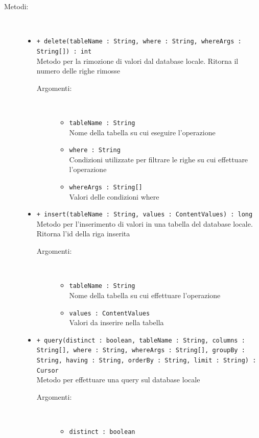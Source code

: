 \documentclass[../DefinizioneDiProdotto.tex]{subfiles}
\begin{document}
\begin{description}
\begin{itemize}
\end{itemize}
\item[Metodi:] \
\begin{itemize}
\item \texttt{+ delete(tableName : String, where : String, whereArgs : String[]) : int}\\
Metodo per la rimozione di valori dal database locale. Ritorna il numero delle righe rimosse
 \begin{description}
\item[Argomenti:] \
\begin{itemize}
\item \texttt{tableName : String}\\
Nome della tabella su cui eseguire l'operazione\item \texttt{where : String}\\
Condizioni utilizzate per filtrare le righe su cui effettuare l'operazione\item \texttt{whereArgs : String[]}\\
Valori delle condizioni where\end{itemize}
\end{description}
\item \texttt{+ insert(tableName : String, values : ContentValues) : long}\\
Metodo per l'inserimento di valori in una tabella del database locale. Ritorna l'id della riga inserita
 \begin{description}
\item[Argomenti:] \
\begin{itemize}
\item \texttt{tableName : String}\\
Nome della tabella su cui effettuare l'operazione\item \texttt{values : ContentValues}\\
Valori da inserire nella tabella\end{itemize}
\end{description}
\item \texttt{+ query(distinct : boolean, tableName : String, columns : String[], where : String, whereArgs : String[], groupBy : String, having : String, orderBy : String, limit : String) : Cursor}\\
Metodo per effettuare una query sul database locale
 \begin{description}
\item[Argomenti:] \
\begin{itemize}
\item \texttt{distinct : boolean}\\

\end{itemize}
\end{description}
\end{itemize}
\end{description}
\end{document}
